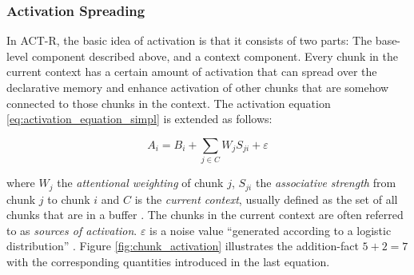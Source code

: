 \subsubsection{Activation Spreading}

In ACT-R, the basic idea of activation is that it consists of two parts: The base-level component described above, and a context component. Every chunk in the current context has a certain amount of activation that can spread over the declarative memory and enhance activation of other chunks that are somehow connected to those chunks in the context. The activation equation \eqref{eq:activation_equation_simpl} is extended as follows:

\begin{equation}
\label{eq:activation_equation}
 A_i = B_i + \sum_{j \in C}{W_j S_{ji}} + \varepsilon
\end{equation}

where $W_j$ the \emph{attentional weighting} of chunk $j$, $S_{ji}$ the \emph{associative strength} from chunk $j$ to chunk $i$ and $C$ is the \emph{current context}\label{current_context}, usually defined as the set of all chunks that are in a buffer \cites[1042]{anderson_integrated_2004}[33]{taatgen_modeling_2006}[unit 5]{actr_tutorial}. The chunks in the current context are often referred to as \emph{sources of activation}. $\varepsilon$ is a noise value ``generated according to a logistic distribution'' \cite[unit 4, p. 4]{actr_tutorial}. Figure \ref{fig:chunk_activation} illustrates the addition-fact $5 + 2 = 7$ with the corresponding quantities introduced in the last equation. 

